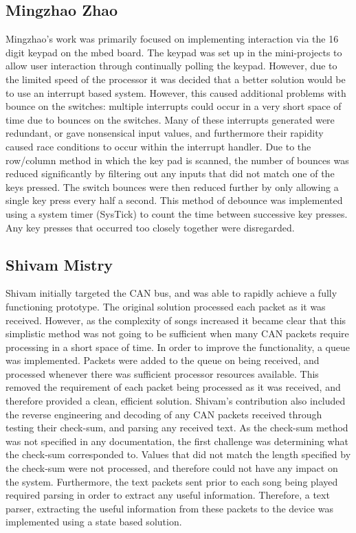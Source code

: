 \subsection*{Mingzhao Zhao}
Mingzhao's work was primarily focused on implementing interaction via 
the 16 digit keypad on the mbed board. The keypad was set up in the mini-projects 
to allow user interaction through continually polling the keypad. However, due 
to the limited speed of the processor it was decided that a better solution 
would be to use an interrupt based system.
However, this caused additional problems with bounce on the switches: 
multiple interrupts could occur in a very short space of time due to bounces on 
the switches. Many of these interrupts generated were redundant, or gave 
nonsensical input values, and furthermore their rapidity caused race conditions 
to occur within the interrupt handler. 
Due to the row/column method in which the key pad is scanned, the 
number of bounces was reduced significantly by filtering out any inputs that 
did not match one of the keys pressed. The switch bounces were then reduced 
further by only allowing a single key press every half a second. 
This method of debounce was implemented using a system 
timer (SysTick) to count the time between successive key presses. Any key 
presses that occurred too closely together were disregarded. 

\subsection*{Shivam Mistry}
Shivam initially targeted the CAN bus, and was able to rapidly achieve a fully 
functioning prototype. The original solution processed each packet as it was 
received. However, as the complexity of songs increased it became clear that this 
simplistic method was not going to be sufficient when many CAN packets require 
processing in a short space of time.
In order to improve the functionality, a queue was implemented. Packets were 
added to the queue on being received, and processed whenever there was sufficient
processor resources available.
This removed the requirement of each packet being processed as it was received,
 and therefore provided a clean, efficient solution.
Shivam's contribution also included the reverse engineering and decoding of any
 CAN packets received through testing their check-sum, and parsing any received 
text.
As the check-sum method was not specified in any documentation, the first 
challenge was determining what the check-sum corresponded to. Values that did 
not match the length specified by the check-sum were not processed, and therefore 
could not have any impact on the system. Furthermore, the text packets sent prior 
to each song being played required parsing in order to extract any useful 
information. Therefore, a text parser, extracting the useful information from 
these packets to the device was implemented using a state based solution. 

